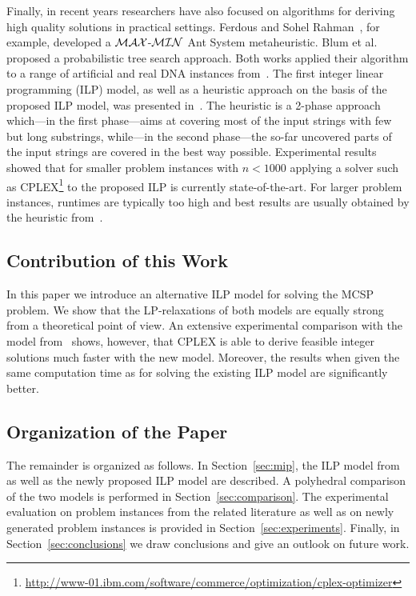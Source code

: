 \documentclass[11pt,a4paper]{article}
\begin{document}
Finally, in recent years researchers have also focused on algorithms for
deriving high quality solutions in practical settings. Ferdous and Sohel
Rahman~\cite{Ferdous2013,FerRah14:arxiv}, for example, developed a
{${\cal MAX}$}-{${\cal MIN}$} {A}nt {S}ystem metaheuristic. Blum et
al.~\cite{BluEtAl14:hm} proposed a probabilistic tree search approach.
Both works applied their algorithm to a range of artificial and real DNA
instances from~\cite{Ferdous2013}. The first integer linear programming
(ILP) model, as well as a heuristic approach on the basis of the
proposed ILP model, was presented in~\cite{BluEtAl15:ejor}. The heuristic is a 2-phase approach which---in the first phase---aims at covering most of the input strings with few but long substrings, while---in the second phase---the so-far uncovered parts of the input strings are covered in the best way possible. 
Experimental results showed that for smaller problem instances with $n < 1000$ 
applying a solver such as
CPLEX\footnote{\url{http://www-01.ibm.com/software/commerce/optimization/cplex-optimizer}}
to the proposed ILP is currently state-of-the-art. 
For larger problem instances, runtimes are typically too high and 
best results are usually obtained by the heuristic from~\cite{BluEtAl15:ejor}. 

\subsection{Contribution of this Work}

In this paper we introduce an alternative ILP model for solving the MCSP
problem. We show that the LP-relaxations of both models are
equally strong from a theoretical point of view.
An extensive experimental comparison with the model
from~\cite{BluEtAl15:ejor} shows, however, that CPLEX is able to derive 
feasible integer solutions much faster with the new model.
Moreover, the results when given the same computation time as for solving the existing ILP model are significantly better. 

\subsection{Organization of the Paper}

The remainder is organized as follows. In Section~\ref{sec:mip}, the ILP model from~\cite{BluEtAl15:ejor} as well as the newly
proposed ILP model are described. A polyhedral comparison of the two
models is performed in Section~\ref{sec:comparison}. 
The experimental evaluation on problem
instances from the related literature as well as on newly generated
problem instances is provided in Section~\ref{sec:experiments}. Finally,
in Section~\ref{sec:conclusions} we draw conclusions and give an outlook
on future work.
\end{document}
